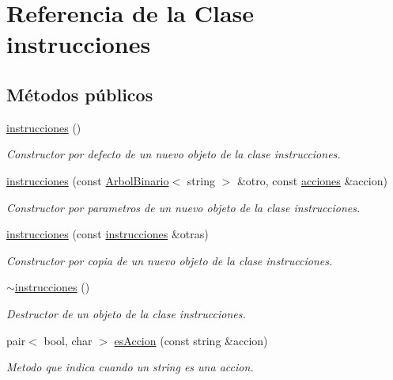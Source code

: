 \hypertarget{classinstrucciones}{}\section{Referencia de la Clase instrucciones}
\label{classinstrucciones}
\subsection*{Métodos públicos}
\begin{DoxyCompactItemize}
\item 
\hyperlink{classinstrucciones_a99948e5f47de8b6f381ce6dc41117491}{instrucciones} ()
\begin{DoxyCompactList}\small\item\em Constructor por defecto de un nuevo objeto de la clase instrucciones. \end{DoxyCompactList}\item 
\hyperlink{classinstrucciones_aab99f88e640abf3f66717a45d7f4dc33}{instrucciones} (const \hyperlink{classArbolBinario}{Arbol\+Binario}$<$ string $>$ \&otro, const \hyperlink{classacciones}{acciones} \&accion)
\begin{DoxyCompactList}\small\item\em Constructor por parametros de un nuevo objeto de la clase instrucciones. \end{DoxyCompactList}\item 
\hyperlink{classinstrucciones_a2da9218bb77463a550bfb25bc1eeb89c}{instrucciones} (const \hyperlink{classinstrucciones}{instrucciones} \&otras)
\begin{DoxyCompactList}\small\item\em Constructor por copia de un nuevo objeto de la clase instrucciones. \end{DoxyCompactList}\item 
\hyperlink{classinstrucciones_ae4edada50c41e03502a09052b41a8c71}{$\sim$instrucciones} ()
\begin{DoxyCompactList}\small\item\em Destructor de un objeto de la clase instrucciones. \end{DoxyCompactList}\item 
pair$<$ bool, char $>$ \hyperlink{classinstrucciones_ad5bd317fefb8e3b92016fda362206f2f}{es\+Accion} (const string \&accion)
\begin{DoxyCompactList}\small\item\em Metodo que indica cuando un string es una accion. \end{DoxyCompactList}\item 

\end{DoxyCompactItemize}
